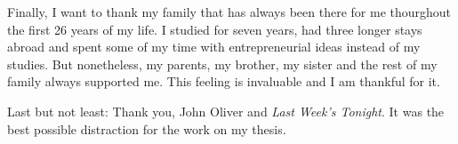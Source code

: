 Finally, I want to thank my family that has always been there for me thourghout the first 26 years of my life. I studied for seven years, had three longer stays abroad and spent some of my time with entrepreneurial ideas instead of my studies. But nonetheless, my parents, my brother, my sister and the rest of my family always supported me. This feeling is invaluable and I am thankful for it.

Last but not least: Thank you, John Oliver and \emph{Last Week's Tonight}. It was the best possible distraction for the work on my thesis.

